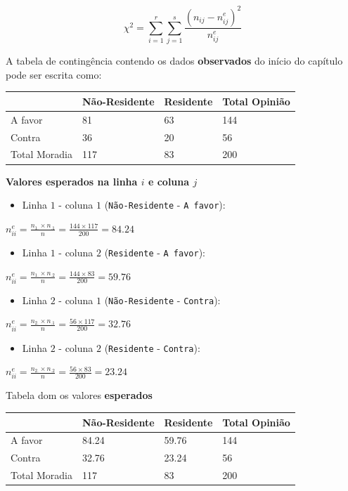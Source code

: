 \documentclass[
]{book}
\providecommand{\tightlist}{%
  \setlength{\itemsep}{0pt}\setlength{\parskip}{0pt}}
\begin{document}
\[\chi^2 = \sum_{i=1}^{r}\sum_{j=1}^{s}\frac{(n_{ij} - n_{ij}^{e})^2}{n_{ij}^{e}}\]

A tabela de contingência contendo os dados \textbf{observados} do início do capítulo pode ser escrita como:

\begin{longtable}[]{@{}llll@{}}
\toprule
& Não-Residente & Residente & Total Opinião \\
\midrule
\endhead
A favor & 81 & 63 & 144 \\
Contra & 36 & 20 & 56 \\
Total Moradia & 117 & 83 & 200 \\
\bottomrule
\end{longtable}

\textbf{Valores esperados na linha \(i\) e coluna \(j\)}

\begin{itemize}
\tightlist
\item
  Linha \(1\) - coluna \(1\) (\texttt{Não-Residente} - \texttt{A\ favor}):
\end{itemize}

\(n_{ii}^{e} = \frac{n_{1.} \times n_{.1}}{n} = \frac{144 \times 117}{200} = 84.24\)

\begin{itemize}
\tightlist
\item
  Linha \(1\) - coluna \(2\) (\texttt{Residente} - \texttt{A\ favor}):
\end{itemize}

\(n_{ii}^{e} = \frac{n_{1.} \times n_{.2}}{n} = \frac{144 \times 83}{200} = 59.76\)

\begin{itemize}
\tightlist
\item
  Linha \(2\) - coluna \(1\) (\texttt{Não-Residente} - \texttt{Contra}):
\end{itemize}

\(n_{ii}^{e} = \frac{n_{2.} \times n_{.1}}{n} = \frac{56 \times 117}{200} = 32.76\)

\begin{itemize}
\tightlist
\item
  Linha \(2\) - coluna \(2\) (\texttt{Residente} - \texttt{Contra}):
\end{itemize}

\(n_{ii}^{e} = \frac{n_{2.} \times n_{.2}}{n} = \frac{56 \times 83}{200} = 23.24\)

Tabela dom os valores \textbf{esperados}

\begin{longtable}[]{@{}llll@{}}
\toprule
& Não-Residente & Residente & Total Opinião \\
\midrule
\endhead
A favor & 84.24 & 59.76 & 144 \\
Contra & 32.76 & 23.24 & 56 \\
Total Moradia & 117 & 83 & 200 \\
\bottomrule
\end{longtable}
\end{document}

